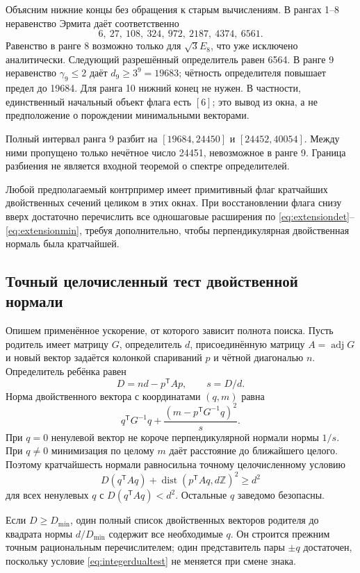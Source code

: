 \documentclass[11pt,a4paper]{article}
\theoremstyle{remark}\newtheorem{remark}[theorem]{Замечание}
\newcommand{\Z}{\mathbb Z}\newcommand{\R}{\mathbb R}\newcommand{\F}{\mathbb F}
\begin{document}
Объясним нижние концы без обращения к старым вычислениям. В рангах 1--8 неравенство Эрмита даёт соответственно
\[
6,\ 27,\ 108,\ 324,\ 972,\ 2187,\ 4374,\ 6561.
\]
Равенство в ранге 8 возможно только для $\sqrt3E_8$, что уже исключено аналитически. Следующий разрешённый определитель равен 6564. В ранге 9 неравенство $\gamma_9\le2$ даёт $d_9\ge3^9=19683$; чётность определителя повышает предел до 19684. Для ранга 10 нижний конец не нужен. В частности, единственный начальный объект флага есть $[6]$; это вывод из окна, а не предположение о порождении минимальными векторами.

Полный интервал ранга 9 разбит на $[19684,24450]$ и $[24452,40054]$. Между ними пропущено только нечётное число 24451, невозможное в ранге 9. Граница разбиения не является входной теоремой о спектре определителей.

Любой предполагаемый контрпример имеет примитивный флаг кратчайших двойственных сечений целиком в этих окнах. При восстановлении флага снизу вверх достаточно перечислить все одношаговые расширения по \eqref{eq:extensiondet}--\eqref{eq:extensionmin}, требуя дополнительно, чтобы перпендикулярная двойственная нормаль была кратчайшей.

\subsection{Точный целочисленный тест двойственной нормали}

Опишем применённое ускорение, от которого зависит полнота поиска. Пусть родитель имеет матрицу $G$, определитель $d$, присоединённую матрицу $A=\operatorname{adj}G$ и новый вектор задаётся колонкой спариваний $p$ и чётной диагональю $n$. Определитель ребёнка равен
\[
D=nd-p^{\mathsf T}Ap,\qquad s=D/d.
\]
Норма двойственного вектора с координатами $(q,m)$ равна
\[
q^{\mathsf T}G^{-1}q+
\frac{(m-p^{\mathsf T}G^{-1}q)^2}{s}.
\]
При $q=0$ ненулевой вектор не короче перпендикулярной нормали нормы $1/s$. При $q\ne0$ минимизация по целому $m$ даёт расстояние до ближайшего целого. Поэтому кратчайшесть нормали равносильна точному целочисленному условию
\begin{equation}\label{eq:integerdualtest}
D(q^{\mathsf T}Aq)+
\operatorname{dist}(p^{\mathsf T}Aq,d\Z)^2\ge d^2
\end{equation}
для всех ненулевых $q$ с $D(q^{\mathsf T}Aq)<d^2$. Остальные $q$ заведомо безопасны.

Если $D\ge D_{\min}$, один полный список двойственных векторов родителя до квадрата нормы $d/D_{\min}$ содержит все необходимые $q$. Он строится прежним точным рациональным перечислителем; один представитель пары $\pm q$ достаточен, поскольку условие \eqref{eq:integerdualtest} не меняется при смене знака.
\end{document}

